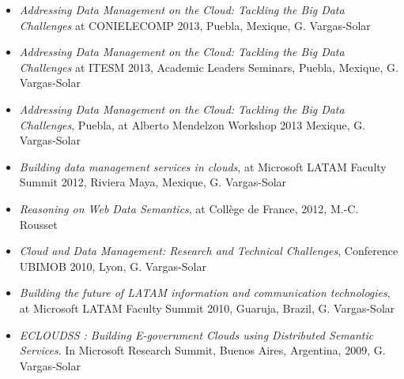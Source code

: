 \begin{itemize}




\item \emph{Addressing Data Management on the Cloud: Tackling the Big Data Challenges}  at CONIELECOMP 2013, Puebla, Mexique, G. Vargas-Solar

\item \emph{Addressing Data Management on the Cloud: Tackling the Big Data Challenges} at ITESM 2013, Academic Leaders Seminars,  Puebla, Mexique, G. Vargas-Solar

\item \emph{ Addressing Data Management on the Cloud: Tackling the Big Data Challenges}, Puebla, at Alberto Mendelzon Workshop 2013 Mexique, G. Vargas-Solar

\item \emph{ Building data management services in clouds}, at Microsoft LATAM Faculty Summit 2012, Riviera Maya, Mexique, G. Vargas-Solar	

\item \emph{Reasoning on Web Data Semantics}, at Coll{\`e}ge de France, 2012, M.-C. Rousset

\item \emph{Cloud and Data Management: Research and Technical Challenges}, Conference UBIMOB 2010, Lyon, G. Vargas-Solar

\item \emph{Building the future of LATAM information and communication technologies}, at Microsoft LATAM Faculty Summit 2010, Guaruja, Brazil, G. 
Vargas-Solar

\item \emph{ ECLOUDSS : Building E-government Clouds using Distributed Semantic Services}. In Microsoft Research Summit, Buenos Aires, Argentina, 2009, G. Vargas-Solar


\end{itemize}
